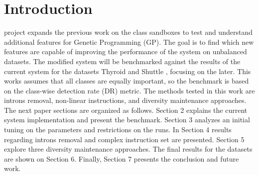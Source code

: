 \documentclass[journal]{IEEEtran}
\begin{document}
\section{Introduction}
% 
% 
% 
% 
 project expands the previous work on the class sandboxes to test and understand additional features for Genetic Programming (GP). The goal is to find which new features are capable of improving the performance of the system on unbalanced datasets. The modified system will be benchmarked against the results of the current system for the datasets Thyroid \cite{thyroid} and Shuttle \cite{shuttle}, focusing on the later. This works assumes that all classes are equally important, so the benchmark is based on the class-wise detection rate (DR) metric. The methods tested in this work are introns removal, non-linear instructions, and diversity maintenance approaches.
The next paper sections are organized as follows. Section 2 explains the current system implementation and present the benchmark. Section 3 analyzes an initial tuning on the parameters and restrictions on the runs. In Section 4 results regarding introns removal and complex instruction set are presented. Section 5 explore three diversity maintenance approaches. The final results for the datasets are shown on Section 6. Finally, Section 7 presents the conclusion and future work.
\end{document}
